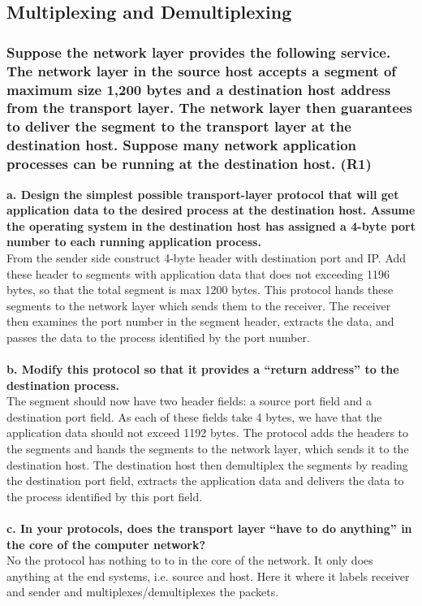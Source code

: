 \subsection{Multiplexing and Demultiplexing}


\subsubsection{Suppose the network layer provides the following service. The network layer in the source host accepts a segment of maximum size 1,200 bytes and a destination host address from the transport layer. The network layer then guarantees to deliver the segment to the transport layer at the destination host. Suppose many network application processes can be running at the destination host. (R1)} 

\textbf{a. Design the simplest possible transport-layer protocol that will get application data to the desired process at the destination host. Assume the operating system in the destination host has assigned a 4-byte port number to each running application process.} \\
From the sender side construct 4-byte header with destination port and IP. Add these header to segments with application data that does not exceeding 1196 bytes, so that the total segment is max 1200 bytes. This protocol hands these segments to the network layer which sends them to the receiver. The receiver then examines the port number in the segment header, extracts the data, and passes the data to the process identified by the port number. \\
\\
\textbf{b. Modify this protocol so that it provides a “return address” to the destination process.} \\
The segment should now have two header fields: a source port field and a destination port field. As each of these fields take 4 bytes, we have that the application data should not exceed 1192 bytes. The protocol adds the headers to the segments and hands the segments to the network layer, which sends it to the destination host. The destination host then demultiplex the segments by reading the destination port field, extracts the application data and delivers the data to the process identified by this port field. \\
\\
\textbf{c. In your protocols, does the transport layer “have to do anything” in the core of the computer network?} \\
No the protocol has nothing to to in the core of the network. It only does anything at the end systems, i.e. source and host. Here it where it labels receiver and sender and multiplexes/demultiplexes the packets.

